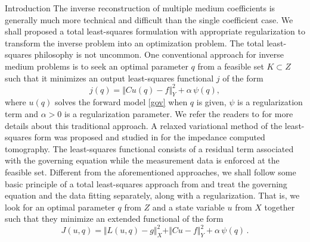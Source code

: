 \documentclass[11pt]{article}%
\renewcommand{\_}{{\fontfamily{ptm}\selectfont\textunderscore}}
\theoremstyle{plain}
\numberwithin{equation}{section}
\begin{document}
\begin{section}{Introduction}
The inverse reconstruction of multiple medium coefficients is generally much more technical and difficult than the single coefficient case. We shall proposed a total least-squares formulation with appropriate regularization 
to transform the inverse problem into an optimization problem.
The total least-squares philosophy is not uncommon. 
One conventional approach for inverse medium problems is to seek an optimal parameter $q$ from a feasible 
set $K\subset Z$ such that it minimizes an output least-squares functional $j$ of the form 
\begin{equation} \label{standard}
j(q) = \Vert Cu(q)-f\Vert_{Y}^2+\alpha\,\psi(q),
\end{equation}
where $u(q)$ solves the forward model \eqref{gov} when $q$ is given, 
$\psi$ is a regularization term and $\alpha>0$ is a regularization parameter. 
We refer the readers to \cite{gibson2005recent,cheney1999electrical,ito2015inverse} for more details about this traditional approach.
A relaxed variational method of the least-squares form was proposed and studied 
in \cite{kohn1987relaxation, wexler1985impedance} for the impedance computed tomography.
The least-squares functional consists of a residual term associated with the governing equation while the measurement data is enforced at the feasible set. Different from the aforementioned approaches, we shall follow some basic principle of a total least-squares approach from \cite{chung2021least} 
and treat the governing equation and the data fitting separately, along with a regularization. That is, 
we look for an optimal parameter $q$ from $Z$ and a state variable $u$ from $X$ together such that they minimize an 
extended functional of the form 
\begin{equation} \label{inv0}
J(u,q)=\Vert L(u,q)- g\Vert_{X}^2+\Vert Cu-f\Vert_{Y}^2+\alpha\,\psi(q)\,.  
\end{equation}


\end{section}
\end{document}
